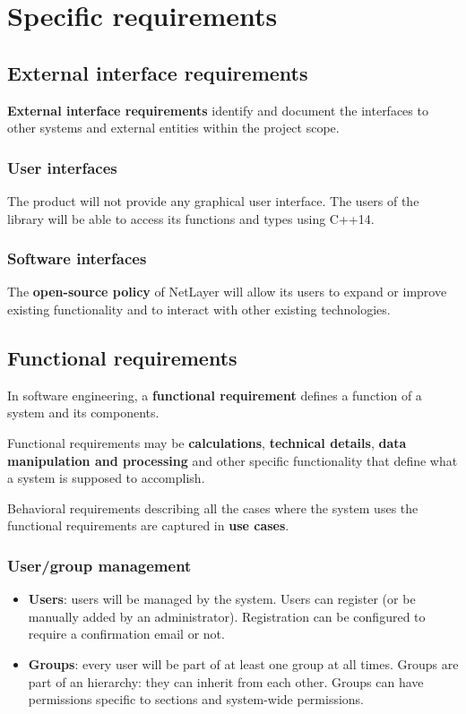 \documentclass[12pt]{report}
\renewcommand\emph{\textbf}
\begin{document}
        \section{Specific requirements}

            \subsection{External interface requirements}

                \emph{External interface requirements} identify and document the interfaces to other systems and external entities within the project scope.

                \subsubsection{User interfaces}
                    The product will not provide any graphical user interface. The users of the library will be able to access its functions and types using C++14.

                \subsubsection{Software interfaces}
                    The \emph{open-source policy} of NetLayer will allow its users to expand or improve existing functionality and to interact with other existing technologies.

            \subsection{Functional requirements}
                In software engineering, a \emph{functional requirement} defines a function of a system and its components.

                Functional requirements may be \emph{calculations}, \emph{technical details}, \emph{data manipulation and processing} and other specific functionality that define what a system is supposed to accomplish.

                Behavioral requirements describing all the cases where the system uses the functional requirements are captured in \emph{use cases}.
                \subsubsection{User/group management}
                    \begin{itemize}
                        \item \emph{Users}: users will be managed by the system. Users can register (or be manually added by an administrator). Registration can be configured to require a confirmation email or not.
                        \item \emph{Groups}: every user will be part of at least one group at all times. Groups are part of an hierarchy: they can inherit from each other. Groups can have permissions specific to sections and system-wide permissions.
                    \end{itemize}
\end{document}
